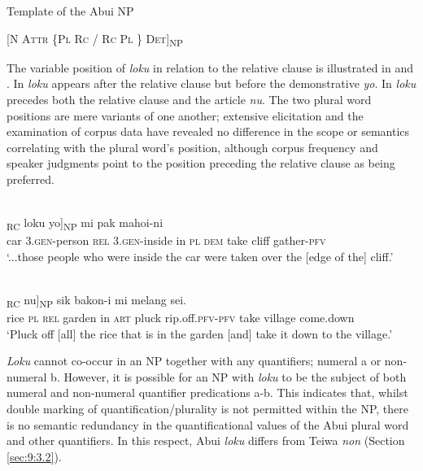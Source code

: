 \ea%
\label{ex:9:46}

 Template of the Abui NP

[\textsc{N  Attr  \{Pl  Rc  /  Rc  Pl \} Det}]\textsubscript{NP}
\z

The variable position of \textit{loku} in relation to the relative clause is illustrated in  and . In  \textit{loku} appears after the relative clause but before the demonstrative \textit{yo}. In  \textit{loku} precedes both the relative clause and the article \textit{nu}. The two plural word positions are mere variants of one another; extensive elicitation and the examination of corpus data have revealed no difference in the scope or semantics correlating with the plural word's position, although corpus frequency and speaker judgments point to the position preceding the relative clause as being preferred.


\ea%
\label{ex:9:47}
 \\
\gll  [...oto he-amakaang [{ba} h-omi {mia}]\textsubscript{RC} loku yo]\textsubscript{NP}  mi pak mahoi-ni \\
  car \textsc{3.gen}-person \textsc{rel} \textsc{3.gen}-inside in \textsc{pl} \textsc{dem}   take cliff gather-\textsc{pfv}  \\
\glt `...those people who were inside the car were taken over the [edge of the] cliff.'
\z
 

\ea%
\label{ex:9:48}
 \\
\gll  [{Sieng} loku [{ba} uti {mia}]\textsubscript{RC} {nu}]\textsubscript{NP} sik bakon-i   mi melang sei. \\
   rice \textsc{pl} \textsc{rel} garden in \textsc{art} pluck rip.off.\textsc{pfv-pfv}   take village come.down \\
\glt `Pluck off [all] the rice that is in the garden [and] take it down to the village.'
\z

 




\textit{Loku} cannot co-occur in an NP together with any quantifiers; numeral a or non-numeral b. However, it is possible for an NP with \textit{loku} to be the subject of both numeral and non-numeral quantifier predications a-b. This indicates that, whilst double marking of quantification/plurality is not permitted within the NP, there is no semantic redundancy in the quantificational values of the Abui plural word and other quantifiers. In this respect, Abui \textit{loku} differs from Teiwa \textit{non} (Section \ref{sec:9:3.2}).


